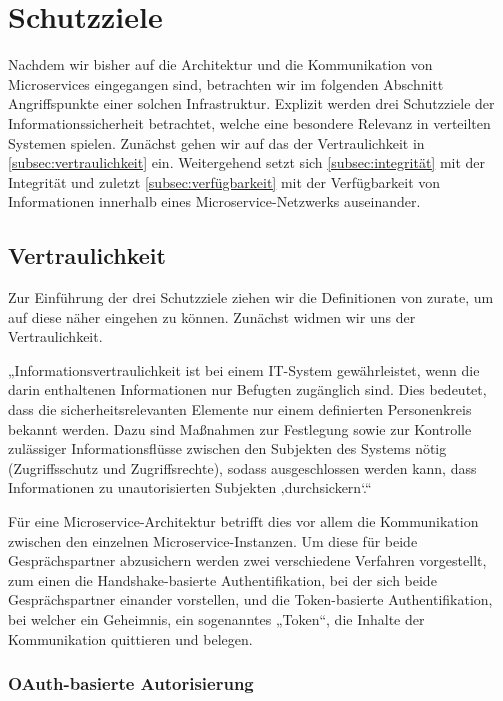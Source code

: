 \section{Schutzziele}
\label{sec:schutzziele}

Nachdem wir bisher auf die Architektur und die Kommunikation von Microservices eingegangen sind, betrachten wir im folgenden Abschnitt Angriffspunkte einer solchen Infrastruktur. Explizit werden drei Schutzziele der Informationssicherheit betrachtet, welche eine besondere Relevanz in verteilten Systemen spielen. Zunächst gehen wir auf das der Vertraulichkeit in \autoref{subsec:vertraulichkeit} ein. Weitergehend setzt sich \autoref{subsec:integrität} mit der Integrität und zuletzt \autoref{subsec:verfügbarkeit} mit der Verfügbarkeit von Informationen innerhalb eines Microservice-Netzwerks auseinander.


\subsection{Vertraulichkeit}
\label{subsec:vertraulichkeit}

Zur Einführung der drei Schutzziele ziehen wir die Definitionen von \citeauthor{Bedner+10} zurate, um auf diese näher eingehen zu können. Zunächst widmen wir uns der Vertraulichkeit.

„Informationsvertraulichkeit ist bei einem IT-System gewährleistet, wenn die darin enthaltenen Informationen nur Befugten zugänglich sind. Dies bedeutet, dass die sicherheitsrelevanten Elemente nur einem definierten Personenkreis bekannt werden. Dazu sind Maßnahmen zur Festlegung sowie zur Kontrolle zulässiger Informationsflüsse zwischen den Subjekten des Systems nötig (Zugriffsschutz und Zugriffsrechte), sodass ausgeschlossen werden kann, dass Informationen zu unautorisierten Subjekten ‚durchsickern‘.“ \cite{Bedner+10}

Für eine Microservice-Architektur betrifft dies vor allem die Kommunikation zwischen den einzelnen Microservice-Instanzen. Um diese für beide Gesprächspartner abzusichern werden zwei verschiedene Verfahren vorgestellt, zum einen die Handshake-basierte Authentifikation, bei der sich beide Gesprächspartner einander vorstellen, und die Token-basierte Authentifikation, bei welcher ein Geheimnis, ein sogenanntes „Token“, die Inhalte der Kommunikation quittieren und belegen.

\subsubsection{OAuth-basierte Autorisierung}

